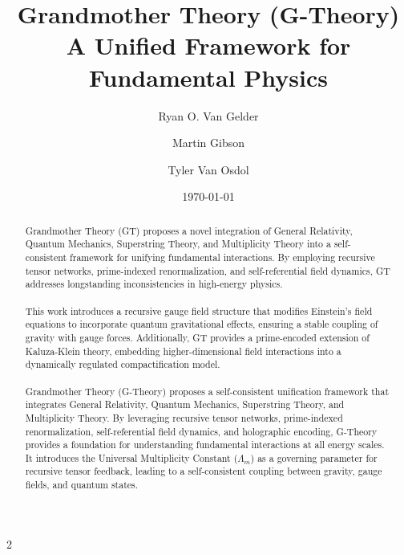 \documentclass{article}
\theoremstyle{plain}
\begin{document}
\title{Grandmother Theory (G-Theory) \\ A Unified Framework for Fundamental Physics}
\author[1]{Ryan O. Van Gelder}
\author[2]{Martin Gibson}
\author[3]{Tyler Van Osdol}
\date{\today}

\maketitle

\begin{abstract}
Grandmother Theory (GT) proposes a novel integration of General Relativity, Quantum Mechanics, Superstring Theory, and Multiplicity Theory into a self-consistent framework for unifying fundamental interactions. By employing recursive tensor networks, prime-indexed renormalization, and self-referential field dynamics, GT addresses longstanding inconsistencies in high-energy physics. 

\paragraph{}This work introduces a recursive gauge field structure that modifies Einstein’s field equations to incorporate quantum gravitational effects, ensuring a stable coupling of gravity with gauge forces. Additionally, GT provides a prime-encoded extension of Kaluza-Klein theory, embedding higher-dimensional field interactions into a dynamically regulated compactification model.

\paragraph{} Grandmother Theory (G-Theory) proposes a self-consistent unification framework that integrates General Relativity, Quantum Mechanics, Superstring Theory, and Multiplicity Theory. By leveraging recursive tensor networks, prime-indexed renormalization, self-referential field dynamics, and holographic encoding, G-Theory provides a foundation for understanding fundamental interactions at all energy scales. It introduces the Universal Multiplicity Constant (\(\Lambda_m\)) as a governing parameter for recursive tensor feedback, leading to a self-consistent coupling between gravity, gauge fields, and quantum states.
\end{abstract}


\newpage
 \begin{multicols}{2}
\begin{singlespace}
\tableofcontents
\end{singlespace}
\end{multicols}
 \newpage
\end{document}
